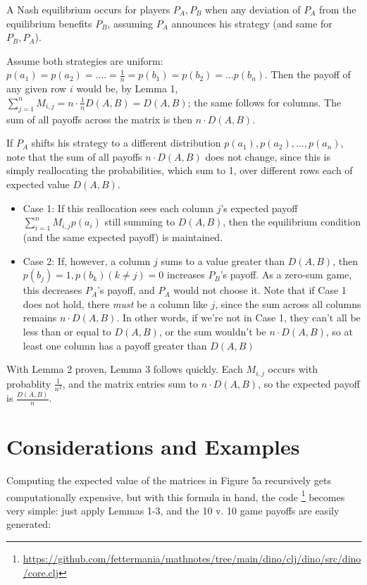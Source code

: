\documentclass[11pt, oneside]{article} 	%
\begin{document}
A Nash equilibrium occurs for players $P_A, P_B$ when any deviation of $P_A$ from the equilibrium benefits $P_B$, assuming $P_A$ announces his strategy (and same for $P_B, P_A$).

Assume both strategies are uniform: $p(a_1) = p(a_2) = .... = \frac{1}{n} = p(b_1) = p(b_2) = ... p(b_n)$. Then the payoff of any given row $i$ would be, by Lemma 1, $\sum_{j=1}^n M_{i,j} = n \cdot \frac{1}{n} D(A,B) = D(A,B)$; the same follows for columns. The sum of all payoffs across the matrix is then $n \cdot D(A,B)$.

If $P_A$ shifts his strategy to a different distribution $p(a_1), p(a_2), ..., p(a_n)$, note that the sum of all payoffs $n\cdot D(A,B)$ does not change, since this is simply reallocating the probabilities, which sum to 1, over different rows each of expected value $D(A,B)$. 

\begin{itemize}
\item Case 1: If this reallocation sees each column $j$'s expected payoff $\sum_{i=1}^n M_{i,j} p(a_i)$  still summing to $D(A,B)$, then the equilibrium condition (and the same expected payoff) is maintained. 
\item Case 2: If, however, a column $j$ sums to a value greater than $D(A,B)$, then $p(b_j) = 1, p(b_k) (k \neq j) = 0$ increases $P_B$'s payoff. As a zero-sum game, this decreases $P_A$'s payoff, and $P_A$ would not choose it. Note that if Case 1 does not hold, there \emph{must} be a column like $j$, since the sum across all columns remains $n \cdot D(A,B)$. In other words, if we're not in Case 1, they can't all be less than or equal to $D(A,B)$, or the sum wouldn't be $n \cdot D(A,B)$, so at least one column has a payoff greater than $D(A,B)$
\end{itemize}


With Lemma 2 proven, Lemma 3 follows quickly. Each $M_{i,j}$ occurs with probablity $\frac{1}{n^2}$, and the matrix entries sum to $n \cdot D(A,B)$, so the expected payoff is $\frac{D(A,B)}{n}$.




\section{Considerations and Examples}

Computing the expected value of the matrices in Figure 5a recursively gets computationally expensive, but with this formula in hand, the code \footnote{\url{https://github.com/fettermania/mathnotes/tree/main/dino/clj/dino/src/dino/core.clj}} becomes very simple: just apply Lemmas 1-3, and the 10 v. 10 game payoffs are easily generated:
\end{document}
